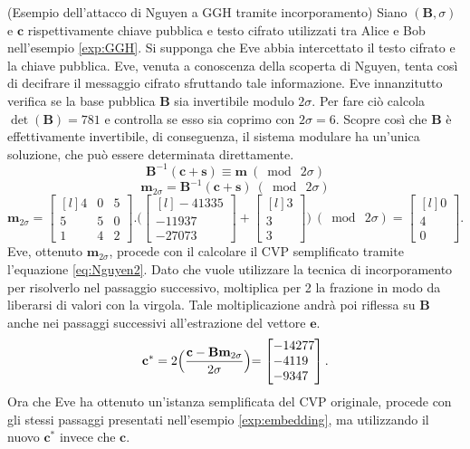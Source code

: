 \begin{exmp}(Esempio dell'attacco di Nguyen a GGH tramite incorporamento) 
Siano $(\mathbf{B}, \sigma)$ e $\mathbf{c}$ rispettivamente chiave pubblica e testo cifrato
utilizzati tra Alice e Bob nell'esempio \ref{exp:GGH}. Si supponga che Eve abbia intercettato 
il testo cifrato e la chiave pubblica. Eve, venuta a conoscenza della scoperta di Nguyen, 
tenta così di decifrare il messaggio cifrato sfruttando tale informazione.
Eve innanzitutto verifica
se la base pubblica $\mathbf{B}$ sia invertibile modulo $2\sigma$. Per fare ciò calcola 
$\det(\mathbf{B}) = 781$ e controlla se esso sia coprimo con $2\sigma=6$. Scopre così che 
$\mathbf{B}$ è effettivamente invertibile, di conseguenza, il sistema modulare ha un'unica 
soluzione, che può essere determinata direttamente.
\[
    \mathbf{B}^{-1}(\mathbf{c}+\mathbf{s}) \equiv \mathbf{m} \ (\bmod \ 2\sigma)
\]
\[
    \mathbf{m}_{2\sigma} = \mathbf{B}^{-1}(\mathbf{c}+\mathbf{s}) \ (\bmod \ 2\sigma)
\]
\begin{equation*}
    \mathbf{m}_{2\sigma} =
    \begin{bmatrix*}[l]
        4 & 0 & 5\\
        5 & 5 & 0\\
        1 & 4 & 2
    \end{bmatrix*}
    .
    \Biggl(
    \begin{bmatrix*}[l]
        -41335\\
        -11937\\
        -27073
    \end{bmatrix*}
    +
    \begin{bmatrix*}[l]
        3\\
        3\\
        3
    \end{bmatrix*}
    \Biggl) \ (\bmod \ 2\sigma)
    =
    \begin{bmatrix*}[l]
        0\\
        4\\
        0
    \end{bmatrix*}.
\end{equation*}
Eve, ottenuto $\mathbf{m}_{2\sigma}$, procede con il calcolare il CVP semplificato tramite
l'equazione \ref{eq:Nguyen2}. Dato che vuole utilizzare la tecnica di incorporamento per
risolverlo nel passaggio successivo, moltiplica per 2 la frazione in modo da liberarsi di 
valori con la virgola. Tale moltiplicazione andrà poi riflessa su $\mathbf{B}$ anche nei 
passaggi successivi all'estrazione del vettore $\mathbf{e}$.
\[
    \mathbf{c}^* = 2 \Bigl(\frac{\mathbf{c} - \mathbf{B}\mathbf{m}_{2\sigma}}{2\sigma}\Bigl)
    = 
    \begin{bmatrix*}[l]
        -14277\\
        -4119\\
        -9347
    \end{bmatrix*}.
\]
Ora che Eve ha ottenuto un'istanza semplificata del CVP originale, procede con gli stessi
passaggi presentati nell'esempio \ref{exp:embedding}, ma utilizzando il nuovo $\mathbf{c}^*$
invece che $\mathbf{c}$.


\end{exmp}
